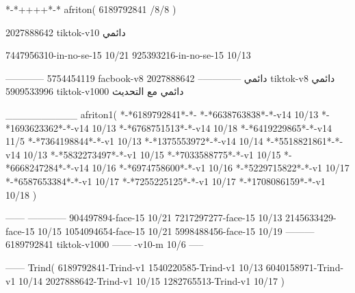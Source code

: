 *-*++++*-*
afriton(
6189792841 /8/8
)

2027888642 tiktok-v10
دائمي


7447956310-in-no-se-15 10/21
925393216-in-no-se-15 10/13

------------
5754454119 facbook-v8
دائمي
--------------
2027888642 tiktok-v8
دائمي
5909533996 tiktok-v1000
دائمي مع التحديث

__________
afriton1(
*-*6189792841*-*-
*-*6638763838*-*-v14 10/13
*-*1693623362*-*-v14 10/13
*-*6768751513*-*-v14 10/18
*-*6419229865*-*-v14 11/5
*-*7364198844*-*-v1 10/13
*-*1375553972*-*-v14 10/14
*-*5518821861*-*-v14 10/13
*-*5832273497*-*-v1 10/15
*-*7033588775*-*-v1 10/15
*-*6668247284*-*-v14 10/16
*-*6974758600*-*-v1 10/16
*-*5229715822*-*-v1 10/17
*-*6587653384*-*-v1 10/17
*-*7255225125*-*-v1 10/17
*-*1708086159*-*-v1 10/18
)

------
------------
904497894-face-15 10/21
7217297277-face-15 10/13
2145633429-face-15 10/15
1054094654-face-15 10/21
5998488456-face-15 10/19
---------
6189792841 tiktok-v1000
------
-v10-m 10/6
-----

------
Trind(
6189792841-Trind-v1 
1540220585-Trind-v1 10/13
6040158971-Trind-v1 10/14
2027888642-Trind-v1 10/15
1282765513-Trind-v1 10/17
)

